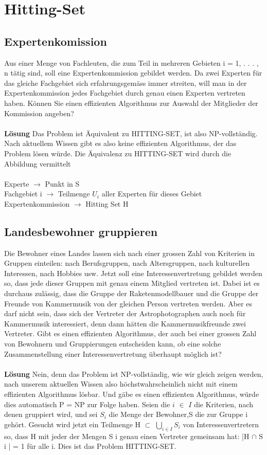 \section{Hitting-Set}
\subsection{Expertenkomission}
Aus einer Menge von Fachleuten, die zum Teil in mehreren Gebieten i = 1, . . . , n tätig sind, soll eine Expertenkommission gebildet werden. Da zwei Experten für das gleiche Fachgebiet sich erfahrungsgemäss immer streiten, will man in der Expertenkommission jedes Fachgebiet durch genau einen Experten vertreten haben. Können Sie einen effizienten Algorithmus zur Auswahl der Mitglieder der Kommission angeben?\\
\\
\textbf{Lösung}
Das Problem ist Äquivalent zu HITTING-SET, ist also NP-vollständig. Nach aktuellem Wissen gibt es also keine effizienten Algorithmus, der das Problem lösen würde. Die Äquivalenz zu HITTING-SET wird durch die Abbildung vermittelt\\
\\
Experte $\rightarrow$ Punkt in S\\
Fachgebiet i $\rightarrow$ Teilmenge $U_i$ aller Experten für dieses Gebiet\\
Expertenkommission $\rightarrow$ Hitting Set H\\

\subsection{Landesbewohner gruppieren}
Die Bewohner eines Landes lassen sich nach einer grossen Zahl von Kriterien in Gruppen einteilen: nach Berufsgruppen, nach Altersgruppen, nach kulturellen Interessen, nach Hobbies usw. Jetzt soll eine Interessenvertretung gebildet werden so, dass jede dieser Gruppen mit genau einem Mitglied vertreten ist. Dabei ist es durchaus zulässig, dass die Gruppe der Raketenmodellbauer und die Gruppe der Freunde von Kammermusik von der gleichen Person vertreten werden. Aber es darf nicht sein, dass sich der Vertreter der Astrophotographen auch noch für Kammermusik interessiert, denn dann hätten die Kammermusikfreunde zwei Vertreter. Gibt es einen effizienten Algorithmus, der auch bei einer grossen Zahl von Bewohnern und Gruppierungen entscheiden kann, ob eine solche Zusammenstellung einer Interessenvertretung überhaupt möglich ist?\\
\\
\textbf{Lösung}
Nein, denn das Problem ist NP-vollständig, wie wir gleich zeigen werden, nach unserem aktuellen Wissen also höchstwahrscheinlich nicht mit einem effizienten Algorithmus lösbar. Und gäbe es einen effizienten Algorithmus, würde dies automatisch P = NP zur Folge haben. Seien die $i$ $\in$ $I$ die Kriterien, nach denen gruppiert wird, und sei $S_i$ die Menge der Bewohner,S die zur Gruppe i gehört. Gesucht wird jetzt ein Teilmenge H $\subset$ $\bigcup_{i \in I} S_i$ von Interessenvertretern so, dass H mit jeder der Mengen S i genau einen Vertreter gemeinsam hat: |H $\cap$ S i | = 1 für alle i. Dies ist das Problem HITTING-SET.\\

